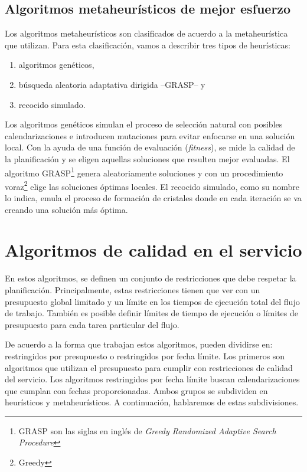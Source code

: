 \subsection{Algoritmos metaheurísticos de mejor esfuerzo}

Los algoritmos metaheurísticos son clasificados de acuerdo a la metaheurística que utilizan. Para esta clasificación, vamos a describir tres tipos de heurísticas: 

\begin{enumerate}
\item{algoritmos genéticos,}
\item{búsqueda aleatoria adaptativa dirigida --GRASP-- y}
\item{recocido simulado.}
\end{enumerate}

Los algoritmos genéticos simulan el proceso de selección natural con posibles calendarizaciones e introducen mutaciones para evitar enfocarse en una solución local. Con la ayuda de una función de evaluación (\emph{fitness}), se mide la calidad de la planificación y se eligen aquellas soluciones que resulten mejor evaluadas. El algoritmo GRASP\footnote{GRASP son las siglas en inglés de \emph{Greedy Randomized Adaptive Search Procedure}} genera aleatoriamente soluciones y con un procedimiento voraz\footnote{Greedy} elige las soluciones óptimas locales. El recocido simulado, como su nombre lo indica, emula el proceso de formación de cristales donde en cada iteración se va creando una solución más óptima.

\section{Algoritmos de calidad en el servicio}
En estos algoritmos, se definen un conjunto de restricciones que debe respetar la planificación. Principalmente, estas restricciones tienen que ver con un presupuesto global limitado y un límite en los tiempos de ejecución total del flujo de trabajo. También es posible definir límites de tiempo de ejecución o límites de presupuesto para cada tarea particular del flujo.

De acuerdo a la forma que trabajan estos algoritmos, pueden dividirse en: restringidos por presupuesto o restringidos por fecha límite. Los primeros son algoritmos que utilizan el presupuesto para cumplir con restricciones de calidad del servicio. Los algoritmos restringidos por fecha límite buscan calendarizaciones que cumplan con fechas proporcionadas. Ambos grupos se subdividen en heurísticos y metaheurísticos. A continuación, hablaremos de estas subdivisiones.

